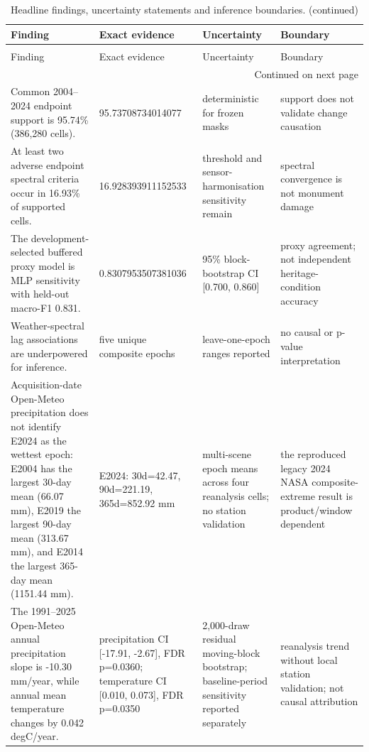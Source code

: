 \begingroup
\scriptsize
\setlength{\tabcolsep}{3pt}
\begin{longtable}{p{}p{}p{}p{}}
\caption{Headline findings, uncertainty statements and inference boundaries.}\label{tab:headline-findings}\\
\toprule
Finding & Exact evidence & Uncertainty & Boundary \\
\midrule
\endfirsthead
\caption[]{Headline findings, uncertainty statements and inference boundaries. (continued)}\\
\toprule
Finding & Exact evidence & Uncertainty & Boundary \\
\midrule
\endhead
\midrule
\multicolumn{4}{r}{Continued on next page}\\
\endfoot
\bottomrule
\endlastfoot
Common 2004--2024 endpoint support is 95.74\% (386,280 cells). & 95.73708734014077 & deterministic for frozen masks & support does not validate change causation \\
At least two adverse endpoint spectral criteria occur in 16.93\% of supported cells. & 16.928393911152533 & threshold and sensor-harmonisation sensitivity remain & spectral convergence is not monument damage \\
The development-selected buffered proxy model is MLP sensitivity with held-out macro-F1 0.831. & 0.8307953507381036 & 95\% block-bootstrap CI [0.700, 0.860] & proxy agreement; not independent heritage-condition accuracy \\
Weather-spectral lag associations are underpowered for inference. & five unique composite epochs & leave-one-epoch ranges reported & no causal or p-value interpretation \\
Acquisition-date Open-Meteo precipitation does not identify E2024 as the wettest epoch: E2004 has the largest 30-day mean (66.07 mm), E2019 the largest 90-day mean (313.67 mm), and E2014 the largest 365-day mean (1151.44 mm). & E2024: 30d=42.47, 90d=221.19, 365d=852.92 mm & multi-scene epoch means across four reanalysis cells; no station validation & the reproduced legacy 2024 NASA composite-extreme result is product/window dependent \\
The 1991--2025 Open-Meteo annual precipitation slope is -10.30 mm/year, while annual mean temperature changes by 0.042 degC/year. & precipitation CI [-17.91, -2.67], FDR p=0.0360; temperature CI [0.010, 0.073], FDR p=0.0350 & 2,000-draw residual moving-block bootstrap; baseline-period sensitivity reported separately & reanalysis trend without local station validation; not causal attribution \\

\end{longtable}
